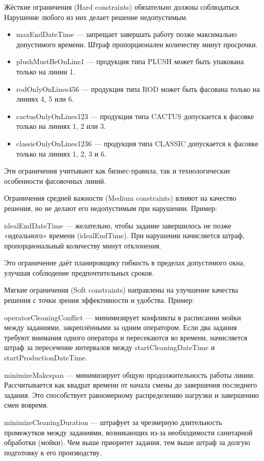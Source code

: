 Жёсткие ограничения (Hard constraints) обязательно должны соблюдаться. Нарушение любого из них делает решение недопустимым.

\begin{itemize}
    \item maxEndDateTime — запрещает завершать работу позже максимально допустимого времени. Штраф пропорционален количеству минут просрочки.
    \item plushMustBeOnLine1 — продукция типа PLUSH может быть упакована только на линии 1.
    \item rodOnlyOnLines456 — продукция типа ROD может быть фасована только на линиях 4, 5 или 6.
    \item cactusOnlyOnLines123 — продукция типа CACTUS допускается к фасовке только на линиях 1, 2 или 3.
    \item classicOnlyOnLines1236 — продукция типа CLASSIC допускается к фасовке только на линиях 1, 2, 3 и 6.
\end{itemize}

Эти ограничения учитывают как бизнес-правила, так и технологические особенности фасовочных линий.

Ограничения средней важности (Medium constraints) влияют на качество решения, но не делают его недопустимым при нарушении. Пример:

idealEndDateTime — желательно, чтобы задание завершилось не позже «идеального» времени (idealEndTime). При нарушении начисляется штраф, пропорциональный количеству минут отклонения.

Это ограничение даёт планировщику гибкость в пределах допустимого окна, улучшая соблюдение предпочтительных сроков.

 Мягкие ограничения (Soft constraints) направлены на улучшение качества решения с точки зрения эффективности и удобства. Пример:

 operatorCleaningConflict — минимизирует конфликты в расписании мойки между заданиями, закреплёнными за одним оператором. Если два задания требуют внимания одного оператора и пересекаются во времени, начисляется штраф за пересечение интервалов между startCleaningDateTime и startProductionDateTime.

 minimizeMakespan — минимизирует общую продолжительность работы линии. Рассчитывается как квадрат времени от начала смены до завершения последнего задания. Это способствует равномерному распределению нагрузки и завершению смен вовремя.

 minimizeCleaningDuration — штрафует за чрезмерную длительность промежутков между заданиями, возникающих из-за необходимости санитарной обработки (мойки). Чем выше приоритет задания, тем выше штраф за долгую подготовку к его производству.

